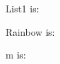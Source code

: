 \documentclass{article}
\begin{document}
List1 is:
\ListI

Rainbow is:
\Rainbow

m is:
\BelieveMe
\end{document}
